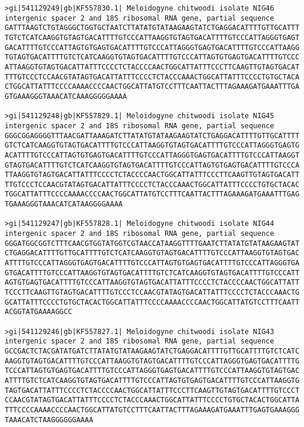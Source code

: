\documentclass[11pt]{article}
\begin{document}
\begin{Verbatim}[commandchars=\\\{\}]
>gi|541129249|gb|KF557830.1| Meloidogyne chitwoodi isolate NIG46 intergenic spacer 2 and 18S ribosomal RNA gene, partial sequence
GATTTAAGTCTGTAGGGCTGGTGCTAATCTTATATGTATAAGAAGTATCTGAGGACATTTTGTTGCATTT
TGTCTCATCAAGGTGTAGTGACATTTTGTCCCATTAAGGTGTAGTGACATTTTGTCCCATTAGGGTGAGT
GACATTTTGTCCCATTAGTGTGAGTGACATTTTGTCCCATTAGGGTGAGTGACATTTTGTCCCATTAAGG
TGTAGTGACATTTTGTCTCATCAAGGTGTAGTGACATTTTGTCCCATTAGTGTGAGTGACATTTTGTCCC
ATTAAGGTGTAGTGACATTATTTCCCCTCTACCCCAACTGGCATTATTTCCCTTCAAGTTGTAGTGACAT
TTTGTCCCTCCAACGTATAGTGACATTATTTCCCCTCTACCCAAACTGGCATTATTTCCCCTGTGCTACA
CTGGCATTATTTCCCCAAAACCCCAACTGGCATTATGTCCTTTCAATTACTTTAGAAAGATGAAATTTGA
GTGAAAGGGTAAACATCAAAGGGGGAAAA

>gi|541129248|gb|KF557829.1| Meloidogyne chitwoodi isolate NIG45 intergenic spacer 2 and 18S ribosomal RNA gene, partial sequence
GGGCGGAGGGGTTTAACGATTAAAGATCTTATATGTATAAGAAGTATCTGAGGACATTTTGTTGCATTTT
GTCTCATCAAGGTGTAGTGACATTTTGTCCCATTAAGGTGTAGTGACATTTTGTCCCATTAGGGTGAGTG
ACATTTTGTCCCATTAGTGTGAGTGACATTTTGTCCCATTAGGGTGAGTGACATTTTGTCCCATTAAGGT
GTAGTGACATTTTGTCTCATCAAGGTGTAGTGACATTTTGTCCCATTAGTGTGAGTGACATTTTGTCCCA
TTAAGGTGTAGTGACATTATTTCCCCTCTACCCCAACTGGCATTATTTCCCTTCAAGTTGTAGTGACATT
TTGTCCCTCCAACGTATAGTGACATTATTTCCCCTCTACCCAAACTGGCATTATTTCCCCTGTGCTACAC
TGGCATTATTTCCCCAAAACCCCAACTGGCATTATGTCCTTTCAATTACTTTAGAAAGATGAAATTTGAG
TGAAAGGGTAAACATCATAAGGGGAAAA

>gi|541129247|gb|KF557828.1| Meloidogyne chitwoodi isolate NIG44 intergenic spacer 2 and 18S ribosomal RNA gene, partial sequence
GGGATGGCGGTCTTTCAACGTGGTATGGTCGTAACCATAAGGTTTTGAATCTTATATGTATAAGAAGTAT
CTGAGGACATTTTGTTGCATTTTGTCTCATCAAGGTGTAGTGACATTTTGTCCCATTAAGGTGTAGTGAC
ATTTTGTCCCATTAGGGTGAGTGACATTTTGTCCCATTAGTGTGAGTGACATTTTGTCCCATTAGGGTGA
GTGACATTTTGTCCCATTAAGGTGTAGTGACATTTTGTCTCATCAAGGTGTAGTGACATTTTGTCCCATT
AGTGTGAGTGACATTTTGTCCCATTAAGGTGTAGTGACATTATTTCCCCTCTACCCCAACTGGCATTATT
TCCCTTCAAGTTGTAGTGACATTTTGTCCCTCCAACGTATAGTGACATTATTTCCCCTCTACCCAAACTG
GCATTATTTCCCCTGTGCTACACTGGCATTATTTCCCCAAAACCCCAACTGGCATTATGTCCTTTCAATT
ACGGTATGAAAAGGCC

>gi|541129246|gb|KF557827.1| Meloidogyne chitwoodi isolate NIG43 intergenic spacer 2 and 18S ribosomal RNA gene, partial sequence
GCCGACTCTACGATATGATCTTATATGTATAAGAAGTATCTGAGGACATTTTGTTGCATTTTGTCTCATC
AAGGTGTAGTGACATTTTGTCCCATTAAGGTGTAGTGACATTTTGTCCCATTAGGGTGAGTGACATTTTG
TCCCATTAGTGTGAGTGACATTTTGTCCCATTAGGGTGAGTGACATTTTGTCCCATTAAGGTGTAGTGAC
ATTTTGTCTCATCAAGGTGTAGTGACATTTTGTCCCATTAGTGTGAGTGACATTTTGTCCCATTAAGGTG
TAGTGACATTATTTCCCCTCTACCCCAACTGGCATTATTTCCCTTCAAGTTGTAGTGACATTTTGTCCCT
CCAACGTATAGTGACATTATTTCCCCTCTACCCAAACTGGCATTATTTCCCCTGTGCTACACTGGCATTA
TTTCCCCAAAACCCCAACTGGCATTATGTCCTTTCAATTACTTTAGAAAGATGAAATTTGAGTGAAAGGG
TAAACATCTAAGGGGGGAAAA


\end{Verbatim}
\end{document}
